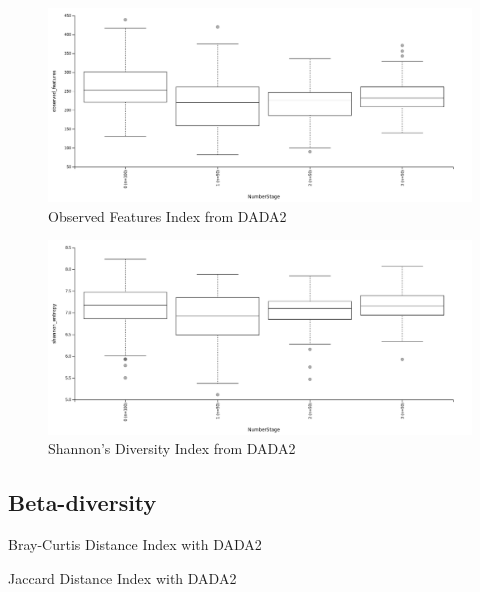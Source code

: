 \documentclass[a4paper]{article}
\begin{document}
            \begin{figure}[p]
                \centering
                \includegraphics[width=0.8 \linewidth]{figures/AlphaDiversity/DADA2/observed.png}
                \caption{Observed Features Index from DADA2}
                \label{fig:observed-dada2}
            \end{figure}

            \begin{figure}[p]
                \centering
                \includegraphics[width=0.8 \linewidth]{figures/AlphaDiversity/DADA2/shannon.png}
                \caption{Shannon's Diversity Index from DADA2}
                \label{fig:shannon-dada2}
            \end{figure}

        \subsection{Beta-diversity}

            \begin{table}[p]
                \centering
                \caption{Bray-Curtis Distance Index with DADA2}
                \label{tb:bray-dada2}
            \end{table}

            \begin{table}[p]
                \centering
                \caption{Jaccard Distance Index with DADA2}
                \label{tb:jaccard-dada2}
            \end{table}
\end{document}
